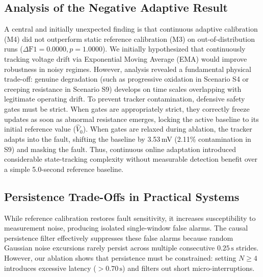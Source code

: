 \documentclass[conference]{IEEEtran}
\begin{document}
\subsection{Analysis of the Negative Adaptive Result}
A central and initially unexpected finding is that continuous adaptive calibration (M4) did not outperform static reference calibration (M3) on out-of-distribution runs ($\Delta\text{F1} = 0.0000, p = 1.0000$). We initially hypothesized that continuously tracking voltage drift via Exponential Moving Average (EMA) would improve robustness in noisy regimes. However, analysis revealed a fundamental physical trade-off: genuine degradation (such as progressive oxidation in Scenario S4 or creeping resistance in Scenario S9) develops on time scales overlapping with legitimate operating drift. To prevent tracker contamination, defensive safety gates must be strict. When gates are appropriately strict, they correctly freeze updates as soon as abnormal resistance emerges, locking the active baseline to its initial reference value ($\hat{V}_0$). When gates are relaxed during ablation, the tracker adapts into the fault, shifting the baseline by 3.53\,mV (2.11\% contamination in S9) and masking the fault. Thus, continuous online adaptation introduced considerable state-tracking complexity without measurable detection benefit over a simple 5.0-second reference baseline.

\subsection{Persistence Trade-Offs in Practical Systems}
While reference calibration restores fault sensitivity, it increases susceptibility to measurement noise, producing isolated single-window false alarms. The causal persistence filter effectively suppresses these false alarms because random Gaussian noise excursions rarely persist across multiple consecutive $0.25\,\text{s}$ strides. However, our ablation shows that persistence must be constrained: setting $N \ge 4$ introduces excessive latency ($> 0.70\,\text{s}$) and filters out short micro-interruptions.
\end{document}

